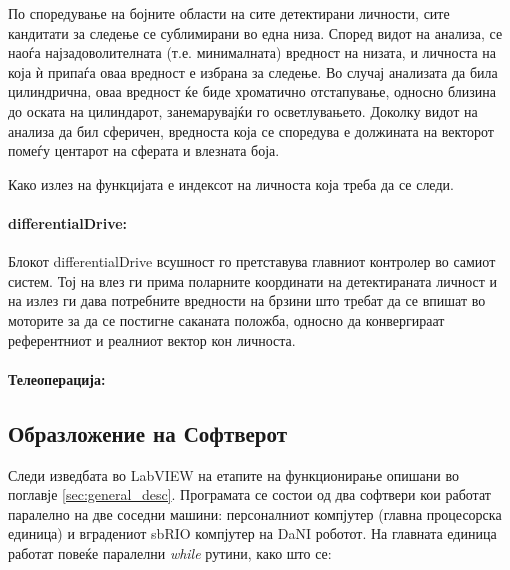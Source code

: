 \documentclass[12pt]{article}
\begin{document}
        По споредување на бојните области на сите детектирани личности, сите кандитати за следење се сублимирани во една низа. Според видот на анализа, се наоѓа најзадоволителната (т.е. минималната) вредност на низата, и личноста на која ѝ припаѓа оваа вредност е избрана за следење. Во случај анализата да била цилиндрична, оваа вредност ќе биде хроматично отстапување, односно близина до оската на цилиндарот, занемарувајќи го осветлувањето. Доколку видот на анализа да бил сферичен, вредноста која се споредува е должината на векторот помеѓу центарот на сферата и влезната боја.

        Како излез на функцијата е индексот на личноста која треба да се следи.

      \paragraph{differentialDrive:\\}
        Блокот differentialDrive всушност го претставува главниот контролер во самиот систем. Тој на влез ги прима поларните координати на детектираната личност и на излез ги дава потребните вредности на брзини што требат да се впишат во моторите за да се постигне саканата положба, односно да конвергираат референтниот и реалниот вектор кон личноста. %

    \paragraph{Телеоперација:\\}
  \subsection{Образложение на Софтверот} %
    Следи изведбата во LabVIEW на етапите на функционирање опишани во поглавје \ref{sec:general_desc}. Програмата се состои од два софтвери кои работат паралелно на две соседни машини: персоналниот компјутер (главна процесорска единица) и вградениот sbRIO компјутер на DaNI роботот. На главната единица работат повеќе паралелни \textit{while} рутини, како што се:
\end{document}
